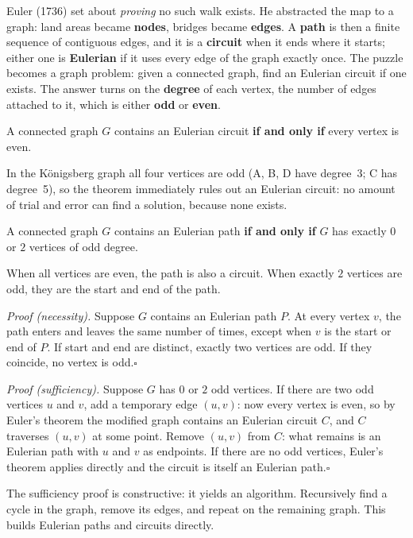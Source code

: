 Euler (1736) set about \emph{proving} no such walk exists. He abstracted the map to a graph: land areas became \textbf{nodes}, bridges became \textbf{edges}. A \textbf{path} is then a finite sequence of contiguous edges, and it is a \textbf{circuit} when it ends where it starts; either one is \textbf{Eulerian} if it uses every edge of the graph exactly once. The puzzle becomes a graph problem: given a connected graph, find an Eulerian circuit if one exists. The answer turns on the \textbf{degree} of each vertex, the number of edges attached to it, which is either \textbf{odd} or \textbf{even}.

\begin{theorem}
  A connected graph $G$ contains an Eulerian circuit \textbf{if and only if} every vertex is even.
\end{theorem}

In the Königsberg graph all four vertices are odd (A, B, D have degree~3; C has degree~5), so the theorem immediately rules out an Eulerian circuit: no amount of trial and error can find a solution, because none exists.

\begin{theorem}
  A connected graph $G$ contains an Eulerian path \textbf{if and only if} $G$ has exactly $0$ or $2$ vertices of odd degree.

  When all vertices are even, the path is also a circuit. When exactly $2$ vertices are odd, they are the start and end of the path.
\end{theorem}

\textit{Proof (necessity).} Suppose $G$ contains an Eulerian path $P$. At every vertex $v$, the path enters and leaves the same number of times, except when $v$ is the start or end of $P$. If start and end are distinct, exactly two vertices are odd. If they coincide, no vertex is odd.\hfill$\square$

\textit{Proof (sufficiency).} Suppose $G$ has $0$ or $2$ odd vertices. If there are two odd vertices $u$ and $v$, add a temporary edge $(u, v)$: now every vertex is even, so by Euler's theorem the modified graph contains an Eulerian circuit $C$, and $C$ traverses $(u, v)$ at some point. Remove $(u, v)$ from $C$: what remains is an Eulerian path with $u$ and $v$ as endpoints. If there are no odd vertices, Euler's theorem applies directly and the circuit is itself an Eulerian path.\hfill$\square$

\begin{notebox}
  The sufficiency proof is constructive: it yields an algorithm. Recursively find a cycle in the graph, remove its edges, and repeat on the remaining graph. This builds Eulerian paths and circuits directly.
\end{notebox}

